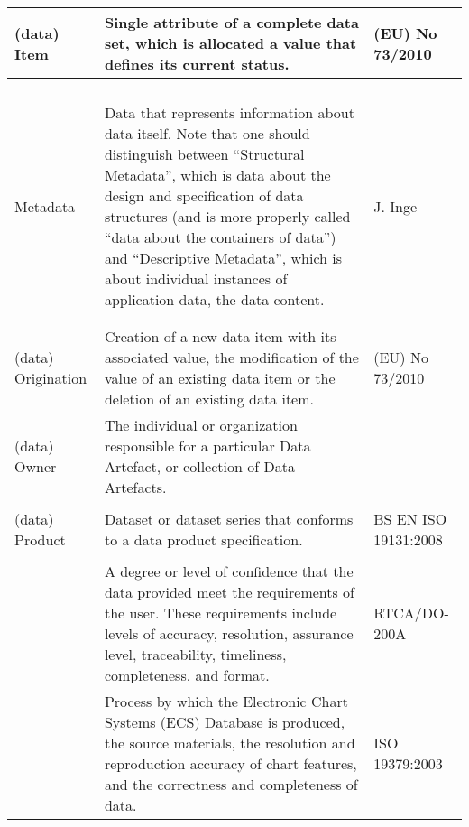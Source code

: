 \begin{longtable}{|p{}|L{}|L{}|}
  \hline
  (data) Item & Single attribute of a complete data set, which is allocated a value that defines its current status. & (EU) No 73/2010 \cite{citation:EU732010}\\
  \hline
  \\
  \hline
  \\
  \hline
  \\
  \hline
  \\
  \hline
  Metadata & Data that represents information about data itself. Note that one should distinguish between ``Structural Metadata'', which is data about the design and specification of data structures (and is more properly called ``data about the containers of data'') and ``Descriptive Metadata'', which is about individual instances of application data, the data content. & J. Inge \cite{citation:inge2008improving}\\
  \hline
  \\
  \hline
  \\
  \hline
  (data) Origination & Creation of a new data item with its associated value, the modification of the value of an existing data item or the deletion of an existing data item. & (EU) No 73/2010 \cite{citation:EU732010}\\
  \hline
  (data) Owner & The individual or organization responsible for a particular Data Artefact, or collection of Data Artefacts. & \\
  \hline
  \\
  \hline
  (data) Product & Dataset or dataset series that conforms to a data product specification. & BS EN ISO 19131:2008 \cite{citation:ISO19131}\\
  \hline
  \\
  \hline
  & A degree or level of confidence that the data provided meet the requirements of the user. These requirements include levels of accuracy, resolution, assurance level, traceability, timeliness, completeness, and format. & RTCA/DO-200A \cite{citation:ED76}\\
  & Process by which the Electronic Chart Systems (ECS) Database is produced, the source materials, the resolution and reproduction accuracy of chart features, and the correctness and completeness of data. & ISO 19379:2003 \cite{citation:ISO19379}\\

\end{longtable}
